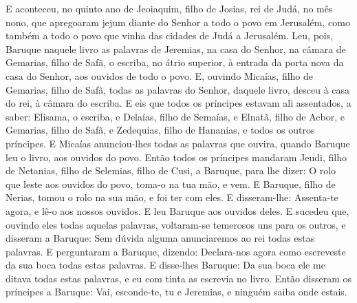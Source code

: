 E aconteceu, no quinto ano de Jeoiaquim, filho de Josias, rei de
Judá, no mês nono, que apregoaram jejum diante do Senhor a todo o
povo em Jerusalém, como também a todo o povo que vinha das cidades
de Judá a Jerusalém. Leu, pois, Baruque naquele livro as
palavras de Jeremias, na casa do Senhor, na câmara de Gemarias,
filho de Safã, o escriba, no átrio superior, à entrada da porta nova
da casa do Senhor, aos ouvidos de todo o povo. E, ouvindo
Micaías, filho de Gemarias, filho de Safã, todas as palavras do
Senhor, daquele livro, desceu à casa do rei, à câmara do
escriba. E eis que todos os príncipes estavam ali assentados, a
saber: Elisama, o escriba, e Delaías, filho de Semaías, e Elnatã,
filho de Acbor, e Gemarias, filho de Safã, e Zedequias, filho de
Hananias, e todos os outros príncipes. E Micaías
anunciou-lhes todas as palavras que ouvira, quando Baruque leu o
livro, aos ouvidos do povo. Então todos os príncipes mandaram
Jeudi, filho de Netanias, filho de Selemias, filho de Cusi, a
Baruque, para lhe dizer: O rolo que leste aos ouvidos do povo,
toma-o na tua mão, e vem. E Baruque, filho de Nerias, tomou o rolo
na sua mão, e foi ter com eles. E disseram-lhe: Assenta-te
agora, e lê-o aos nossos ouvidos. E leu Baruque aos ouvidos deles.
E sucedeu que, ouvindo eles todas aquelas palavras,
voltaram-se temerosos uns para os outros, e disseram a Baruque: Sem
dúvida alguma anunciaremos ao rei todas estas palavras. E
perguntaram a Baruque, dizendo: Declara-nos agora como escreveste da
sua boca todas estas palavras. E disse-lhes Baruque: Da sua
boca ele me ditava todas estas palavras, e eu com tinta as escrevia
no livro. Então disseram os príncipes a Baruque: Vai,
esconde-te, tu e Jeremias, e ninguém saiba onde estais.

